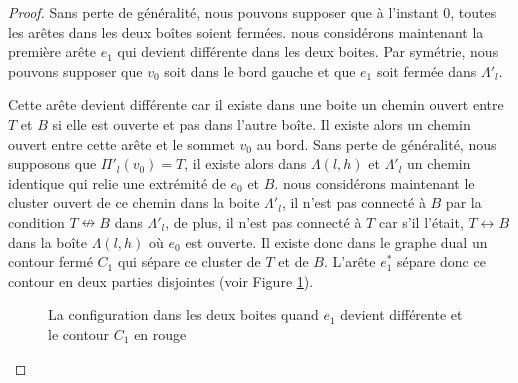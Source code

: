 \documentclass[titlepage,a4paper,12pt]{article}
\newcounter{cor}
\begin{document}
\begin{proof}
Sans perte de généralité, nous pouvons supposer que à l'instant 0, toutes les arêtes dans les deux boîtes soient fermées. nous considérons maintenant la première arête $e_1$ qui devient différente dans les deux boites. Par symétrie, nous pouvons supposer que $v_0$ soit dans le bord gauche et que $e_1$ soit fermée dans $\Lambda'_l$.

Cette arête devient différente car il existe dans une boite un chemin ouvert entre $T$ et $B$ si elle est ouverte et pas dans l'autre boîte. Il existe alors un chemin ouvert entre cette arête et le sommet $v_0$ au bord. Sans perte de généralité, nous supposons que $\Pi'_l(v_0)=T$, il existe alors dans $\Lambda(l,h)$ et $\Lambda'_l$ un chemin identique qui relie une extrémité de $e_0$ et $B$. nous considérons maintenant le cluster ouvert de ce chemin dans la boite $\Lambda'_l$, il n'est pas connecté à $B$ par la condition $T\nleftrightarrow B$ dans $\Lambda'_l$, de plus, il n'est pas connecté à $T$ car s'il l'était, $T\longleftrightarrow B$ dans la boîte $\Lambda(l,h)$ où $e_0$ est ouverte. Il existe donc dans le graphe dual un contour fermé $C_1$ qui sépare ce cluster de $T$ et de $B$. L'arête $e^*_1$ sépare donc ce contour en deux parties disjointes (voir Figure \ref{fig:e1}). 
\begin{figure}[h]
\begin{minipage}{0.45\linewidth}
\center
{}
\end{minipage}
\begin{minipage}{0.45\linewidth}
\center
{}
\end{minipage}
\caption{La configuration dans les deux boites quand $e_1$ devient différente et le contour $C_1$ en rouge}
\label{fig:e1}
\end{figure}


\end{proof}
\end{document}

